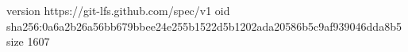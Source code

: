 version https://git-lfs.github.com/spec/v1
oid sha256:0a6a2b26a56bb679bbee24e255b1522d5b1202ada20586b5c9af939046dda8b5
size 1607
